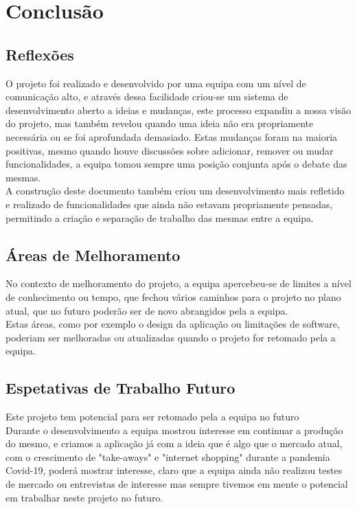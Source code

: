 \chapter{Conclusão}
\label{conclusão}
\section{Reflexões}
O projeto foi realizado e desenvolvido por uma equipa com um nível de comunicação alto, e através dessa facilidade criou-se um sistema de desenvolvimento aberto a ideias e mudanças, este processo expandiu a nossa visão do projeto, mas também revelou quando uma ideia não era propriamente necessária ou se foi aprofundada demasiado. Estas mudanças foram na maioria positivas, mesmo quando houve discussões sobre adicionar, remover ou mudar funcionalidades, a equipa tomou sempre uma posição conjunta após o debate das mesmas.\\
A construção deste documento também criou um desenvolvimento mais refletido e realizado de funcionalidades que ainda não estavam propriamente pensadas, permitindo a criação e separação de trabalho das mesmas entre a equipa.
\section{Áreas de Melhoramento}
No contexto de melhoramento do projeto, a equipa apercebeu-se de limites a nível de conhecimento ou tempo, que fechou vários caminhos para o projeto no plano atual, que no futuro poderão ser de novo abrangidos pela a equipa.\\
Estas áreas, como por exemplo o design da aplicação ou limitações de software, poderiam ser melhoradas ou atualizadas quando o projeto for retomado pela a equipa. 
\section{Espetativas de Trabalho Futuro}
Este projeto tem potencial para ser retomado pela a equipa no futuro\\
Durante o desenvolvimento a equipa mostrou interesse em continuar a produção do mesmo, e criamos a aplicação já com a ideia que é algo que o mercado atual, com o crescimento de "take-aways" e "internet shopping" durante a pandemia Covid-19, poderá mostrar interesse, claro que a equipa ainda não realizou testes de mercado ou entrevistas de interesse mas sempre tivemos em mente o potencial em trabalhar neste projeto no futuro.